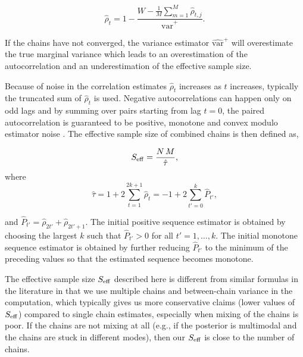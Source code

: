 \documentclass[american,]{article}
\theoremstyle{definition}
\begin{document}
\begin{equation}
\hat{\rho}_t
= 1 - \frac{\displaystyle W - \textstyle \frac{1}{M}\sum_{m=1}^M 
\hat{\rho}_{t,j}}{\widehat{\mbox{var}}^{+}}. \label{rhohat}
\end{equation}

If the chains have not converged, the variance estimator
\(\widehat{\mbox{var}}^{+}\) will overestimate the true marginal
variance which leads to an overestimation of the autocorrelation and an
underestimation of the effective sample size.

Because of noise in the correlation estimates \(\hat{\rho}_t\) increases
as \(t\) increases, typically the truncated sum of \(\hat{\rho}_t\) is
used. Negative autocorrelations can happen only on odd lags and by
summing over pairs starting from lag \(t=0\), the paired autocorrelation
is guaranteed to be positive, monotone and convex modulo estimator noise
\citep{Geyer:1992, Geyer:2011}. The effective sample size of combined
chains is then defined as,

\begin{equation}
S_{\rm eff} = \frac{N \, M}{\hat{\tau}},
\end{equation} where \begin{equation}
\hat{\tau} = 1 + 2 \sum_{t=1}^{2k+1} \hat{\rho}_t = 
-1 + 2 \sum_{t'=0}^{k} \hat{P}_{t'},
\end{equation}

and \(\hat{P}_{t'}=\hat{\rho}_{2t'}+\hat{\rho}_{2t'+1}\). The initial
positive sequence estimator is obtained by choosing the largest \(k\)
such that \(\hat{P}_{t'}>0\) for all \(t' = 1,\ldots,k\). The initial
monotone sequence estimator is obtained by further reducing
\(\hat{P}_{t'}\) to the minimum of the preceding values so that the
estimated sequence becomes monotone.

The effective sample size \(S_{\rm eff}\) described here is different
from similar formulas in the literature in that we use multiple chains
and between-chain variance in the computation, which typically gives us
more conservative claims (lower values of \(S_{\rm eff}\)) compared to
single chain estimates, especially when mixing of the chains is poor. If
the chains are not mixing at all (e.g., if the posterior is multimodal and
the chains are stuck in different modes), then our \(S_{\rm eff}\) is
close to the number of chains.


\end{document}

